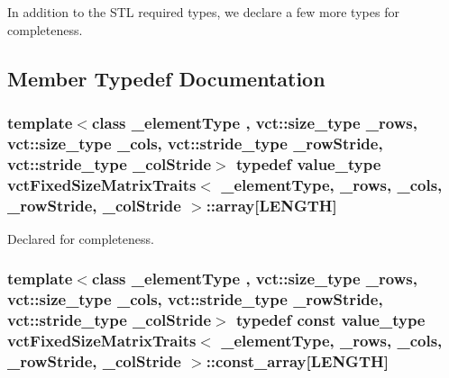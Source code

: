 In addition to the S\-T\-L required types, we declare a few more types for completeness. 

\subsection{Member Typedef Documentation}
\hypertarget{classvct_fixed_size_matrix_traits_a3894b24d65c8d4b54d17192001d28dc2}{
\subsubsection[{array}]{\setlength{\rightskip}{0pt plus 5cm}template$<$class \-\_\-element\-Type , vct\-::size\-\_\-type \-\_\-rows, vct\-::size\-\_\-type \-\_\-cols, vct\-::stride\-\_\-type \-\_\-row\-Stride, vct\-::stride\-\_\-type \-\_\-col\-Stride$>$ typedef value\-\_\-type {\bf vct\-Fixed\-Size\-Matrix\-Traits}$<$ \-\_\-element\-Type, \-\_\-rows, \-\_\-cols, \-\_\-row\-Stride, \-\_\-col\-Stride $>$\-::array\mbox{[}{\bf L\-E\-N\-G\-T\-H}\mbox{]}}}\label{classvct_fixed_size_matrix_traits_a3894b24d65c8d4b54d17192001d28dc2}
Declared for completeness. \hypertarget{classvct_fixed_size_matrix_traits_ac7459b07165b6f472e2f5238cc069b55}{
\subsubsection[{const\-\_\-array}]{\setlength{\rightskip}{0pt plus 5cm}template$<$class \-\_\-element\-Type , vct\-::size\-\_\-type \-\_\-rows, vct\-::size\-\_\-type \-\_\-cols, vct\-::stride\-\_\-type \-\_\-row\-Stride, vct\-::stride\-\_\-type \-\_\-col\-Stride$>$ typedef const value\-\_\-type {\bf vct\-Fixed\-Size\-Matrix\-Traits}$<$ \-\_\-element\-Type, \-\_\-rows, \-\_\-cols, \-\_\-row\-Stride, \-\_\-col\-Stride $>$\-::const\-\_\-array\mbox{[}{\bf L\-E\-N\-G\-T\-H}\mbox{]}}}\label{classvct_fixed_size_matrix_traits_ac7459b07165b6f472e2f5238cc069b55}
